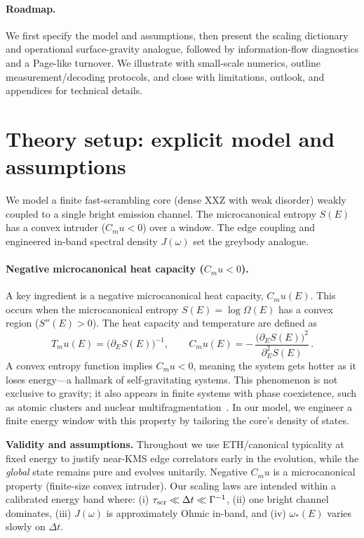 \documentclass[aps,prx,onecolumn,showpacs,superscriptaddress,longbibliography,nofootinbib]{revtex4-2}
\def\mu{mu}%
\begin{document}
\paragraph*{Roadmap.} We first specify the model and assumptions, then present the scaling dictionary and operational surface-gravity analogue, followed by information-flow diagnostics and a Page-like turnover. We illustrate with small-scale numerics, outline measurement/decoding protocols, and close with limitations, outlook, and appendices for technical details.

\section{Theory setup: explicit model and assumptions}
We model a finite fast-scrambling core (dense XXZ with weak disorder) weakly coupled to a single bright emission channel. The microcanonical entropy $S(E)$ has a convex intruder ($C_\mu<0$) over a window. The edge coupling and engineered in-band spectral density $J(\omega)$ set the greybody analogue.

\paragraph*{Negative microcanonical heat capacity ($C_\mu<0$).}
A key ingredient is a negative microcanonical heat capacity, $C_\mu(E)$. This occurs when the microcanonical entropy $S(E)=\log\Omega(E)$ has a convex region ($S''(E)>0$). The heat capacity and temperature are defined as
\begin{equation}
 T_\mu(E) = \big(\partial_E S(E)\big)^{-1},\qquad C_\mu(E) = -\,\frac{\big(\partial_E S(E)\big)^2}{\partial_E^2 S(E)}\,.
\end{equation}
A convex entropy function implies $C_\mu<0$, meaning the system gets hotter as it loses energy---a hallmark of self-gravitating systems. This phenomenon is not exclusive to gravity; it also appears in finite systems with phase coexistence, such as atomic clusters and nuclear multifragmentation~\cite{GrossBook2001,Schmidt2001Na147,DAgostino2000}. In our model, we engineer a finite energy window with this property by tailoring the core's density of states.

\noindent\textbf{Validity and assumptions.}
Throughout we use ETH/canonical typicality at fixed energy to justify near-KMS edge correlators early in the evolution, while the \emph{global} state remains pure and evolves unitarily. Negative $C_\mu$ is a microcanonical property (finite-size convex intruder). Our scaling laws are intended within a calibrated energy band where: (i) $\tau_{\rm scr}\ll\Delta t\ll\Gamma^{-1}$, (ii) one bright channel dominates, (iii) $J(\omega)$ is approximately Ohmic in-band, and (iv) $\omega_\ast(E)$ varies slowly on $\Delta t$.
\end{document}
